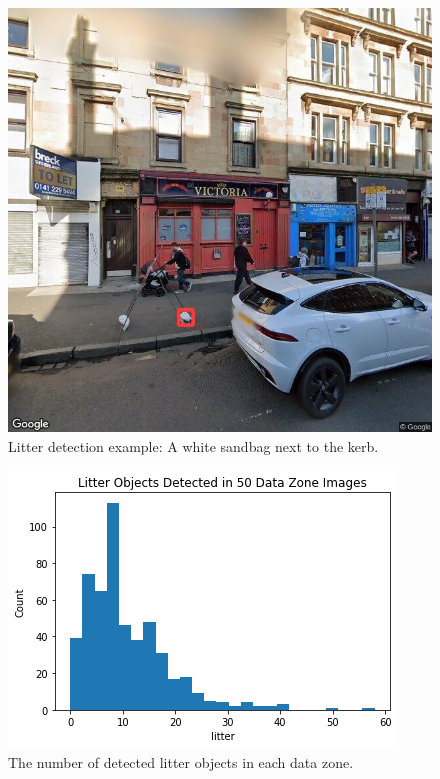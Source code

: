 \documentclass{thesis}
\begin{document}
\begin{figure}[h!]
    \centering
    \includegraphics[scale=0.45]{images/flaw-sandbag.jpg}
    \caption{Litter detection example: A white sandbag next to the kerb.}
    \label{fig:sandbag}
\end{figure}
\newpage

\begin{figure}[h!]
    \centering
    \includegraphics[scale=0.6]{images/litter-hist.png}
    \caption{The number of detected litter objects in each data zone.}
    \label{fig:litter-histogram}
\end{figure}
\end{document}
